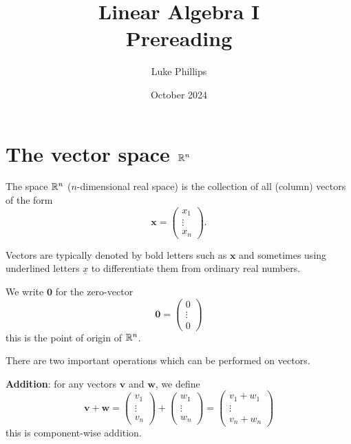 \documentclass[10pt, a4paper]{article}
\title{Linear Algebra I \\
    \large Prereading}
\author{Luke Phillips}
\date{October 2024}
\begin{document}
\maketitle

\newpage

\tableofcontents

\newpage

\section{The vector space \texorpdfstring{$\mathbb{R} ^ n$}{}}
\begin{definition}
    The space $\mathbb{R} ^ n$ ($n$-dimensional real space) is the collection of all (column) vectors of the form
    \[
    \mathbf{x} =
    \begin{pmatrix}
        x_1 \\
        \vdots \\
        x_n
    \end{pmatrix}.
    \]
\end{definition}
Vectors are typically denoted by bold letters such as $\mathbf{x}$ and sometimes using underlined letters $\underline{x}$ to differentiate them from ordinary real numbers.

We write $\mathbf{0}$ for the zero-vector
\[
\mathbf{0} = \begin{pmatrix}
    0 \\
    \vdots \\
    0
\end{pmatrix}
\]
this is the point of origin of $\mathbb{R} ^ n$.

There are two important operations which can be performed on vectors.

\textbf{Addition}: for any vectors $\mathbf{v}$ and $\mathbf{w}$, we define
\[
\mathbf{v + w} =
\begin{pmatrix}
    v_1 \\
    \vdots \\
    v_n
\end{pmatrix}
+
\begin{pmatrix}
    w_1 \\
    \vdots \\
    w_n
\end{pmatrix}
=
\begin{pmatrix}
    v_1 + w_1 \\
    \vdots \\
    v_n + w_n
\end{pmatrix}
\]
this is component-wise addition.
\end{document}
